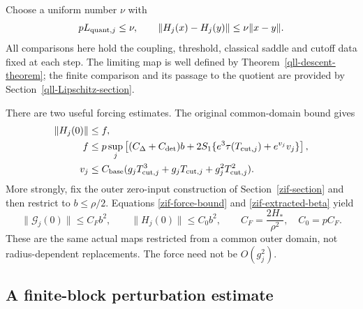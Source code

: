 \documentclass[11pt]{article}
\theoremstyle{remark}
\begin{document}
Choose a uniform number $\nu$ with
\begin{equation}
 pL_{{\rm quant},j}\le\nu,\qquad
 \|H_j(x)-H_j(y)\|\le\nu\|x-y\|.
 \label{eqr-projected-lipschitz}
\end{equation}
All comparisons here hold the coupling, threshold, classical saddle
and cutoff data fixed at each step. The limiting map is well defined
by Theorem~\ref{qll-descent-theorem}; the finite comparison and its
passage to the quotient are provided by
Section~\ref{qll-Lipschitz-section}.

There are two useful forcing estimates. The original common-domain
bound gives
\begin{align}
 \|H_j(0)\|&\le f, \notag\\
 f&\le p\sup_j\left[
 (C_\Delta+C_{\rm det})b+
 2S_1\{e^3\tau(T_{{\rm cut},j})+e^{v_j}v_j\}\right],
 \notag\\
 v_j&\le C_{\rm base}
       (g_jT_{{\rm cut},j}^3+g_jT_{{\rm cut},j}
                              +g_j^2T_{{\rm cut},j}^2).
 \label{eqr-crude-force}
\end{align}
More strongly, fix the outer zero-input construction of
Section~\ref{zif-section} and then restrict to $b\le\rho/2$.
Equations \eqref{zif-force-bound} and
\eqref{zif-extracted-beta} yield
\begin{equation}
 \|\mathcal G_j(0)\|\le C_Fb^2,\qquad
 \|H_j(0)\|\le C_0b^2,\qquad
 C_F=\frac{2H_*}{\rho^2},\quad C_0=pC_F.
 \label{eqr-quadratic-force}
\end{equation}
These are the same actual maps restricted from a common outer
domain, not radius-dependent replacements. The force need not be
$O(g_j^2)$.

\subsection{A finite-block perturbation estimate}
\label{eqr-block-section}
\end{document}
